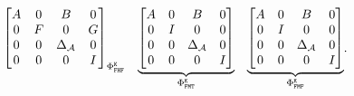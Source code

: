 \begin{equation}
\begin{matrix}
{\begin{bmatrix}
                A & 0 & B & 0 \\
                0 & F & 0 & G \\
                0 & 0 & \Delta_{\mathcal{A}}& 0 \\
                0 & 0 & 0 & I
            \end{bmatrix}}_{\Phi_{\texttt{F}\texttt{H}\texttt{F}}^{\texttt{K}}} &
            \underbrace{\begin{bmatrix}
                A & 0 & B & 0 \\
                0 & I & 0 & 0 \\
                0 & 0 & \Delta_{\mathcal{A}} & 0 \\
                0 & 0 & 0 & I
            \end{bmatrix}}_{\Phi_{\texttt{F}\texttt{M}\texttt{T}}^{\texttt{K}}} &
            \underbrace{\begin{bmatrix}
                A & 0 & B & 0 \\
                0 & I & 0 & 0 \\
                0 & 0 & \Delta_{\mathcal{A}} & 0 \\
                0 & 0 & 0 & I
            \end{bmatrix}}_{\Phi_{\texttt{F}\texttt{M}\texttt{F}}^{\texttt{K}}}
        \end{matrix}.
    \end{equation}%
